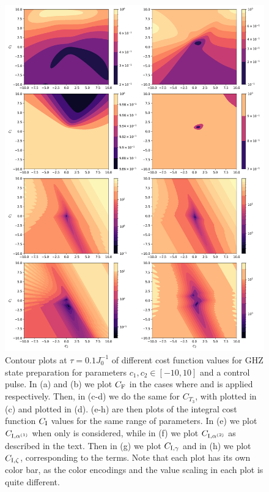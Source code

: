 \begin{figure}[t]
    \centering
    \includegraphics[width=0.8\linewidth]{images/final_plot_max_nogrape.png} \caption[Contour plots of cost function landscapes for GHZ state preparation in frustrated spin systems (maximum amplitude cost function) using a bare optimisation pulse.]{Contour plots at $\tau = 0.1 J_0^{-1}$ of different cost function values for GHZ state preparation for parameters $c_1, c_2 \in [-10,10]$ and a  control pulse. In (a) and (b) we plot $C_{\rm F}$ in the cases where  and   is applied respectively. Then, in (c-d) we do the same for $C_{T_3}$, with   plotted in (c) and   plotted in (d). (e-h) are then plots of the integral cost function $C_{\rm I}$ values for the same range of parameters. In (e) we plot $C_{\rm I, \alpha^{(1)}}$ when only   is considered, while in (f) we plot $C_{\rm I, \alpha^{(2)}}$ as described in the text. Then in (g) we plot $C_{\rm I, \gamma}$ and in (h) we plot $C_{\rm I, \zeta}$, corresponding to the  terms. Note that each plot has its own color bar, as the color encodings and the value scaling in each plot is quite different.}\label{fig:ghz_contours_max_noGRAPE}
\end{figure}


